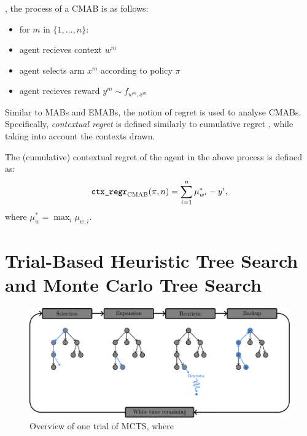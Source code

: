         , the process of a CMAB is as follows:
        \begin{itemize}
            \item for $m$ in $\{1,...,n\}$:
            \item agent recieves context $w^m$
            \item agent selects arm $x^m$ according to policy $\pi$
            \item agent recieves reward $y^m \sim f_{w^m,x^m}$
        \end{itemize}

        Similar to MABs and EMABs, the notion of regret is used to analyse CMABs. Specifically, \textit{contextual regret} is defined similarly to cumulative regret , while taking into account the contexts drawn.

        \begin{defn}
            The \textnormal{(cumulative) contextual regret} of the agent in the above process is defined as:
            \begin{align}
                {\textnormal{\texttt{ctx\_regr}}}_{{\textnormal{CMAB}}}(\pi,n) = \sum_{i=1}^n \mu_{w^i}^* - y^i,
            \end{align}
            where $\mu_{w}^* = \max_i \mu_{w,i}$.
        \end{defn}



        














\section{Trial-Based Heuristic Tree Search and Monte Carlo Tree Search}
\label{sec:2-4-thts}

    \begin{figure}
        \centering\includegraphics[width=1.0\textwidth]{figures/ch2/mcts_trial.pdf} 
        \caption[Overview of one trial of MCTS.]{Overview of one trial of MCTS, where }
        \label{fig:mcts}
    \end{figure}

